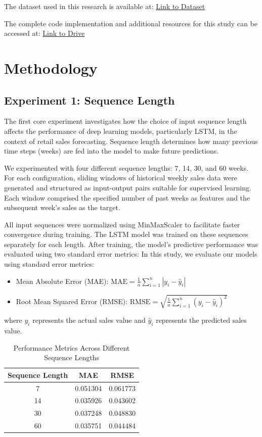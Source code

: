 \documentclass[conference]{IEEEtran}
\begin{document}
The dataset used in this research is available at: \href{https://www.kaggle.com/c/walmart-recruiting-store-sales-forecasting}{Link to Dataset}

The complete code implementation and additional resources for this study can be accessed at: \href{https://drive.google.com/drive/folders/1Blwt9kzis8_tNPtCi_sRwcQ4WPWRJHMP}{Link to Drive}


\section{Methodology}

\subsection{Experiment 1: Sequence Length}
The first core experiment investigates how the choice of input sequence length affects the performance of deep learning models, particularly LSTM, in the context of retail sales forecasting. Sequence length determines how many previous time steps (weeks) are fed into the model to make future predictions.

We experimented with four different sequence lengths: 7, 14, 30, and 60 weeks. For each configuration, sliding windows of historical weekly sales data were generated and structured as input-output pairs suitable for supervised learning. Each window comprised the specified number of past weeks as features and the subsequent week's sales as the target.

All input sequences were normalized using MinMaxScaler to facilitate faster convergence during training. The LSTM model was trained on these sequences separately for each length. After training, the model's predictive performance was evaluated using two standard error metrics:
In this study, we evaluate our models using standard error metrics:
\begin{itemize}
  \item Mean Absolute Error (MAE): $\text{MAE} = \frac{1}{n}\sum_{i=1}^{n}|y_i - \hat{y}_i|$
  \item Root Mean Squared Error (RMSE): $\text{RMSE} = \sqrt{\frac{1}{n}\sum_{i=1}^{n}(y_i - \hat{y}_i)^2}$
\end{itemize}
where $y_i$ represents the actual sales value and $\hat{y}_i$ represents the predicted sales value.

\begin{table}[h!]
\centering
\begin{tabular}{|c|c|c|}
\hline
\textbf{Sequence Length} & \textbf{MAE} & \textbf{RMSE} \\
\hline
7  &  0.051304 &0.061773 \\
14 & 0.035926  & 0.043602 \\
30 & 0.037248   & 0.048830 \\
60 &  0.035751 & 0.044484 \\
\hline
\end{tabular}
\vspace{0.5cm}
\caption{Performance Metrics Across Different Sequence Lengths}
\end{table}
\end{document}
